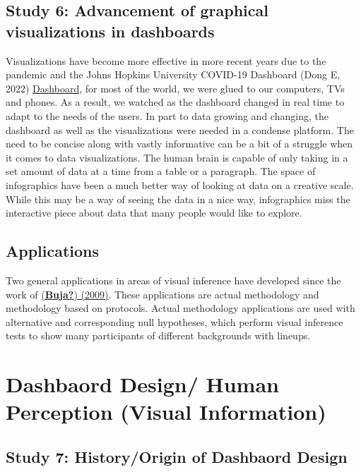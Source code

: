 \documentclass[print]{nuthesis}
\begin{document}
\hypertarget{study-6-advancement-of-graphical-visualizations-in-dashboards}{%
\subsection{Study 6: Advancement of graphical visualizations in dashboards}\label{study-6-advancement-of-graphical-visualizations-in-dashboards}}

Visualizations have become more effective in more recent years due to the pandemic and the Johns Hopkins University COVID-19 Dashboard (Dong E, 2022) \href{https://coronavirus.jhu.edu/map.html}{Dashboard}, for most of the world, we were glued to our computers, TVs and phones. As a result, we watched as the dashboard changed in real time to adapt to the needs of the users. In part to data growing and changing, the dashboard as well as the visualizations were needed in a condense platform. The need to be concise along with vastly informative can be a bit of a struggle when it comes to data visualizations. The human brain is capable of only taking in a set amount of data at a time from a table or a paragraph. The space of infographics have been a much better way of looking at data on a creative scale. While this may be a way of seeing the data in a nice way, infographics miss the interactive piece about data that many people would like to explore.

\hypertarget{applications}{%
\subsection{Applications}\label{applications}}

Two general applications in areas of visual inference have developed since the work of \href{}{(\textbf{Buja?}) (2009)}. These applications are actual methodology and methodology based on protocols. Actual methodology applications are used with alternative and corresponding null hypotheses, which perform visual inference tests to show many participants of different backgrounds with lineups.

\hypertarget{dashbaord-design-human-perception-visual-information}{%
\section{Dashbaord Design/ Human Perception (Visual Information)}\label{dashbaord-design-human-perception-visual-information}}

\hypertarget{study-7-historyorigin-of-dashbaord-design}{%
\subsection{Study 7: History/Origin of Dashbaord Design}\label{study-7-historyorigin-of-dashbaord-design}}
\end{document}
